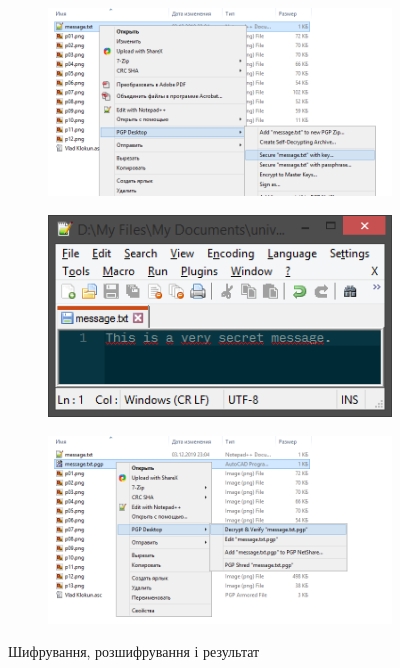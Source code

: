 \documentclass[
	a4paper,
	oneside,
	BCOR = 10mm,
	DIV = 12,
	12pt,
	headings = normal,
]{scrartcl}
\newlength{\gridunitwidth}
\begin{document}
		\begin{figure}[!htbp]
			\begin{subfigure}[b]{8 \gridunitwidth - 1em / (2-1)}
				\includegraphics[width = \columnwidth]{./assets/p13.png}
				\caption{}
				\label{subfig:enc}
			\end{subfigure}%
			\hspace{1em}%
			\begin{subfigure}[b]{4 \gridunitwidth - 1em / (2-1)}
				\includegraphics[width = \columnwidth]{./assets/p15.png}
				\caption{}
				\label{subfig:dec}
			\end{subfigure}
			\begin{subfigure}[b]{8 \gridunitwidth - 1em / (2-1)}
				\includegraphics[width = \columnwidth]{./assets/p14.png}
				\caption{}
				\label{subfig:dec}
			\end{subfigure}
			\caption{Шифрування, розшифрування і результат}
			\label{fig:enc-dec-file}
		\end{figure}
\end{document}

